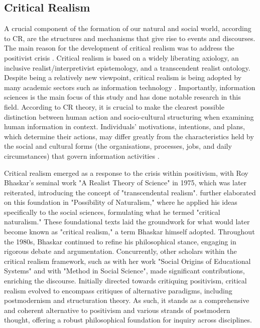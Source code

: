 \subsection{Critical Realism}
\par{A crucial component of the formation of our natural and social world, according to CR, are the structures and mechanisms that give rise to events and discourses.
The main reason for the development of critical realism was to address the positivist crisis \citep{carlsson2003critical}. Critical realism is based on a widely liberating axiology, an inclusive realist/interpretivist epistemology, and a transcendent realist ontology. Despite being a relatively new viewpoint, critical realism is being adopted by many academic sectors such as information technology \citep{easton2010critical}. Importantly, information sciences is the main focus of  this study and \cite{wikgren2005critical} has done notable research in this field. According to CR theory, it is crucial to make the clearest possible distinction between human action and socio-cultural structuring when examining human information in context. Individuals' motivations, intentions, and plans, which determine their actions, may differ greatly from the characteristics held by the social and cultural forms (the organisations, processes, jobs, and daily circumstances) that govern information activities \citep{wikgren2005critical}.}
\par{Critical realism emerged as a response to the crisis within positivism, with Roy Bhaskar's seminal work "A Realist Theory of Science" in 1975, which was later reiterated, introducing the concept of "transcendental realism". \cite{bhaskar2013realist} further elaborated on this foundation in "Possibility of Naturalism,"  where he applied his ideas specifically to the social sciences, formulating what he termed "critical naturalism." These foundational texts laid the groundwork for what would later become known as "critical realism," a term Bhaskar himself adopted. Throughout the 1980s, Bhaskar continued to refine his philosophical stance, engaging in rigorous debate and argumentation. Concurrently, other scholars within the critical realism framework, such as \cite{archer2013social} with her work "Social Origins of Educational Systems" and \cite{sayer1992method} with "Method in Social Science", made significant contributions, enriching the discourse. Initially directed towards critiquing positivism, critical realism evolved to encompass critiques of alternative paradigms, including postmodernism and structuration theory. As such, it stands as a comprehensive and coherent alternative to positivism and various strands of postmodern thought, offering a robust philosophical foundation for inquiry across disciplines.}
